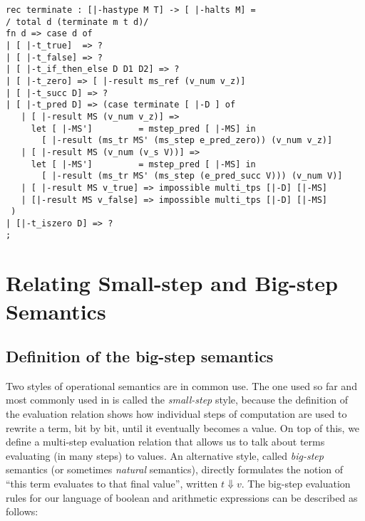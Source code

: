 \begin{lstlisting}
rec terminate : [|-hastype M T] -> [ |-halts M] =
/ total d (terminate m t d)/
fn d => case d of
| [ |-t_true]  => ?
| [ |-t_false] => ?
| [ |-t_if_then_else D D1 D2] => ?
| [ |-t_zero] => [ |-result ms_ref (v_num v_z)]
| [ |-t_succ D] => ?
| [ |-t_pred D] => (case terminate [ |-D ] of
   | [ |-result MS (v_num v_z)] =>
     let [ |-MS']         = mstep_pred [ |-MS] in
       [ |-result (ms_tr MS' (ms_step e_pred_zero)) (v_num v_z)]
   | [ |-result MS (v_num (v_s V))] =>
     let [ |-MS']         = mstep_pred [ |-MS] in
       [ |-result (ms_tr MS' (ms_step (e_pred_succ V))) (v_num V)]
   | [ |-result MS v_true] => impossible multi_tps [|-D] [|-MS] 
   | [|-result MS v_false] => impossible multi_tps [|-D] [|-MS] 
 )
| [|-t_iszero D] => ?
;
\end{lstlisting}


\section{Relating Small-step and Big-step Semantics}

\subsection{Definition of the big-step semantics}

Two styles of operational semantics are in common use. The one used so far and
most commonly used in \cite{TAPL} is called the {\em small-step} style, because the definition of the
evaluation relation shows how individual steps of computation are used to
rewrite a term, bit by bit, until it eventually becomes a value. On top of this,
we define a multi-step evaluation relation that allows us to talk about terms
evaluating (in many steps) to values. An alternative style, called
{\em big-step} semantics (or sometimes {\em natural} semantics), directly
formulates the notion of ``this term evaluates to that final value'', written
$t \Downarrow v$. The big-step evaluation rules for our language of boolean and
arithmetic expressions can be described as follows:

